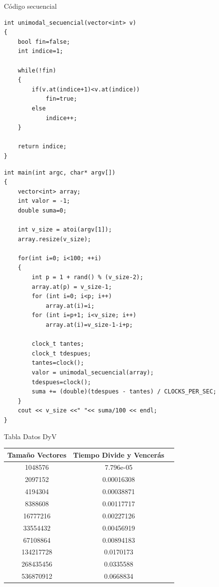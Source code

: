\documentclass[12pt]{beamer}
\begin{document}
\begin{frame}[fragile]{Código secuencial}
	\begin{lstlisting}
int unimodal_secuencial(vector<int> v)
{
	bool fin=false;
  	int indice=1;

  	while(!fin)
  	{
     	if(v.at(indice+1)<v.at(indice))
      		fin=true;
     	else
      		indice++;
  	}

  	return indice;
}
	\end{lstlisting}
\end{frame}

\begin{frame}[fragile]
	\begin{lstlisting}
int main(int argc, char* argv[])
{
	vector<int> array;
  	int valor = -1;
	double suma=0;

  	int v_size = atoi(argv[1]);
  	array.resize(v_size);

	for(int i=0; i<100; ++i)
	{
		int p = 1 + rand() % (v_size-2);
  		array.at(p) = v_size-1;
  		for (int i=0; i<p; i++)
  			array.at(i)=i;
  		for (int i=p+1; i<v_size; i++)
  			array.at(i)=v_size-1-i+p;

  		clock_t tantes;
  		clock_t tdespues;
  		tantes=clock();
  		valor = unimodal_secuencial(array);
  		tdespues=clock();
		suma += (double)(tdespues - tantes) / CLOCKS_PER_SEC;
	}
  	cout << v_size <<" "<< suma/100 << endl;
}
	\end{lstlisting}

\end{frame}

\begin{frame}{Tabla Datos DyV}
\begin{tabular}{|c|c|c|}
\hline 
Tamaño Vectores & Tiempo Divide y Vencerás \\ 
\hline 
1048576 & 7.796e-05 \\ 
\hline 
2097152 & 0.00016308  \\ 
\hline 
4194304 & 0.00038871  \\ 
\hline 
8388608 & 0.00117717  \\ 
\hline 
16777216 & 0.00227126  \\ 
\hline 
33554432 & 0.00456919  \\ 
\hline 
67108864 & 0.00894183  \\ 
\hline 
134217728 & 0.0170173  \\ 
\hline 
268435456 & 0.0335588 \\ 
\hline 
536870912 & 0.0668834 \\ 
\hline 
\end{tabular} 

\end{frame}
\end{document}
